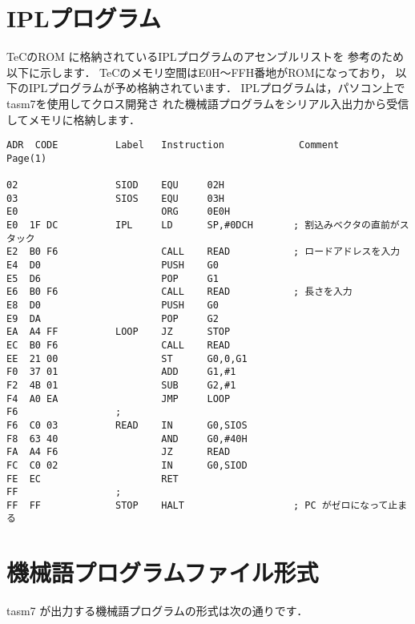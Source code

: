 \newpage
\section{IPLプログラム}\label{iplsrc}
TeCのROM に格納されているIPLプログラムのアセンブルリストを
参考のため以下に示します．
TeCのメモリ空間はE0H〜FFH番地がROMになっており，
以下のIPLプログラムが予め格納されています．
IPLプログラムは，パソコン上でtasm7を使用してクロス開発さ
れた機械語プログラムをシリアル入出力から受信してメモリに格納します．

\begin{center}
\begin{verbatim}
ADR  CODE          Label   Instruction             Comment              Page(1)

02                 SIOD    EQU     02H            
03                 SIOS    EQU     03H            
E0                         ORG     0E0H           
E0  1F DC          IPL     LD      SP,#0DCH       ; 割込みベクタの直前がスタック
E2  B0 F6                  CALL    READ           ; ロードアドレスを入力
E4  D0                     PUSH    G0             
E5  D6                     POP     G1             
E6  B0 F6                  CALL    READ           ; 長さを入力
E8  D0                     PUSH    G0             
E9  DA                     POP     G2             
EA  A4 FF          LOOP    JZ      STOP           
EC  B0 F6                  CALL    READ           
EE  21 00                  ST      G0,0,G1        
F0  37 01                  ADD     G1,#1          
F2  4B 01                  SUB     G2,#1          
F4  A0 EA                  JMP     LOOP           
F6                 ;
F6  C0 03          READ    IN      G0,SIOS        
F8  63 40                  AND     G0,#40H        
FA  A4 F6                  JZ      READ           
FC  C0 02                  IN      G0,SIOD        
FE  EC                     RET                    
FF                 ;
FF  FF             STOP    HALT                   ; PC がゼロになって止まる
\end{verbatim}
\end{center}

\newpage
\section{機械語プログラムファイル形式}
\label{appB:fileformat}
tasm7 が出力する機械語プログラムの形式は次の通りです．

